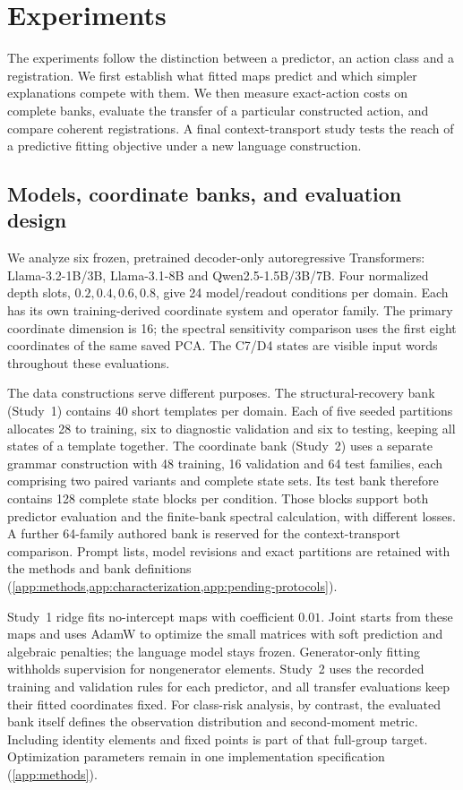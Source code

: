 \section{Experiments}
\label{sec:pending-studies}
\label{sec:evidence}
The experiments follow the distinction between a predictor, an action class and a registration. We first establish what fitted maps predict and which simpler explanations compete with them. We then measure exact-action costs on complete banks, evaluate the transfer of a particular constructed action, and compare coherent registrations. A final context-transport study tests the reach of a predictive fitting objective under a new language construction.

\subsection{Models, coordinate banks, and evaluation design}
\label{sec:design}
We analyze six frozen, pretrained decoder-only autoregressive Transformers: Llama-3.2-1B/3B, Llama-3.1-8B and Qwen2.5-1.5B/3B/7B. Four normalized depth slots, $0.2,0.4,0.6,0.8$, give 24 model/readout conditions per domain. Each has its own training-derived coordinate system and operator family. The primary coordinate dimension is 16; the spectral sensitivity comparison uses the first eight coordinates of the same saved PCA. The C7/D4 states are visible input words throughout these evaluations.

The data constructions serve different purposes. The structural-recovery bank (Study~1) contains 40 short templates per domain. Each of five seeded partitions allocates 28 to training, six to diagnostic validation and six to testing, keeping all states of a template together. The coordinate bank (Study~2) uses a separate grammar construction with 48 training, 16 validation and 64 test families, each comprising two paired variants and complete state sets. Its test bank therefore contains 128 complete state blocks per condition. Those blocks support both predictor evaluation and the finite-bank spectral calculation, with different losses. A further 64-family authored bank is reserved for the context-transport comparison. Prompt lists, model revisions and exact partitions are retained with the methods and bank definitions (\cref{app:methods,app:characterization,app:pending-protocols}).

\hypertarget{par:estimation}{}
Study~1 ridge fits no-intercept maps with coefficient $0.01$. Joint starts from these maps and uses AdamW to optimize the small matrices with soft prediction and algebraic penalties; the language model stays frozen. Generator-only fitting withholds supervision for nongenerator elements. Study~2 uses the recorded training and validation rules for each predictor, and all transfer evaluations keep their fitted coordinates fixed. For class-risk analysis, by contrast, the evaluated bank itself defines the observation distribution and second-moment metric. Including identity elements and fixed points is part of that full-group target. Optimization parameters remain in one implementation specification (\cref{app:methods}).


